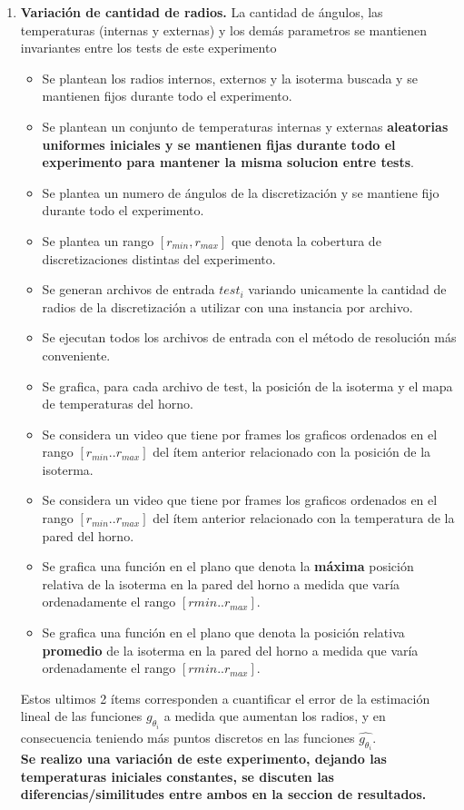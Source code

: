 \begin{enumerate}
    \item \textbf{Variación de cantidad de radios.} La cantidad de ángulos, las temperaturas (internas y externas) y los demás parametros se mantienen invariantes entre los tests de este experimento
    \begin{itemize}
        \item Se plantean los radios internos, externos y la isoterma buscada y se mantienen fijos durante todo el experimento.
        \item Se plantean un conjunto de temperaturas internas y externas \textbf{aleatorias uniformes iniciales y se mantienen fijas durante todo el experimento para mantener la misma solucion entre tests}.
        \item Se plantea un numero de ángulos de la discretización y se mantiene fijo durante todo el experimento. 
        \item Se plantea un rango $[r_{min}, r_{max}]$ que denota la cobertura de discretizaciones distintas del experimento.
        \item Se generan archivos de entrada $test_i$ variando unicamente la cantidad de radios de la discretización a utilizar con una instancia por archivo.
        \item Se ejecutan todos los archivos de entrada con el método de resolución más conveniente.
        \item Se grafica, para cada archivo de test, la posición de la isoterma y el mapa de temperaturas del horno.
        \item Se considera un video que tiene por frames los graficos ordenados en el rango $[r_{min}..r_{max}]$ del ítem anterior relacionado con la posición de la isoterma.
        \item Se considera un video que tiene por frames los graficos ordenados en el rango $[r_{min}..r_{max}]$ del ítem anterior relacionado con la temperatura de la pared del horno.
        \item Se grafica una función en el plano que denota la \textbf{máxima} posición relativa de la isoterma en la pared del horno a medida que varía ordenadamente el rango $[r{min}..r_{max}]$.
        \item Se grafica una función en el plano que denota la posición relativa \textbf{promedio} de la isoterma en la pared del horno a medida que varía ordenadamente el rango $[r{min}..r_{max}]$.
    \end{itemize}  Estos ultimos 2 ítems corresponden a cuantificar el error de la estimación lineal de las funciones $g_{\theta_i}$ a medida que aumentan los radios, y en consecuencia teniendo más puntos discretos en las funciones $\hat{g_{\theta_i}}$.\\
    \textbf{Se realizo una variación de este experimento, dejando las temperaturas iniciales constantes, se discuten las diferencias/similitudes entre ambos en la seccion de resultados.}


\end{enumerate}
